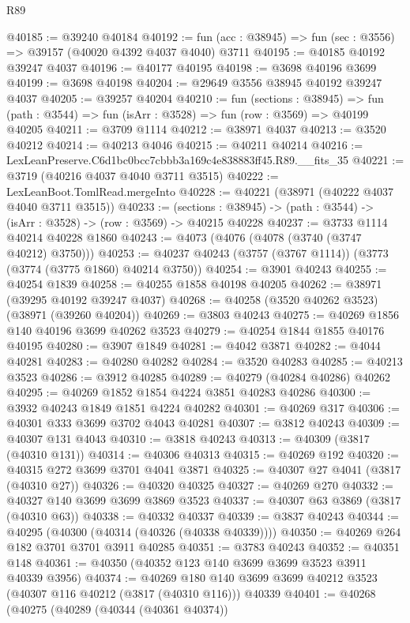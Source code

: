 \begin{lexlean}{R89}
\begin{coremodule}
@40185 := @39240 @40184
@40192 := fun (acc : @38945) => fun (sec : @3556) => @39157 (@40020 @4392 @4037 @4040) @3711
@40195 := @40185 @40192 @39247 @4037
@40196 := @40177 @40195
@40198 := @3698 @40196 @3699
@40199 := @3698 @40198
@40204 := @29649 @3556 @38945 @40192 @39247 @4037
@40205 := @39257 @40204
@40210 := fun (sections : @38945) =>
  fun (path : @3544) => fun (isArr : @3528) => fun (row : @3569) => @40199 @40205
@40211 := @3709 @1114
@40212 := @38971 @4037
@40213 := @3520 @40212
@40214 := @40213 @4046
@40215 := @40211 @40214
@40216 := LexLeanPreserve.C6d1bc0bcc7cbbb3a169c4e838883ff45.R89.__fits_35
@40221 := @3719 (@40216 @4037 @4040 @3711 @3515)
@40222 := LexLeanBoot.TomlRead.mergeInto
@40228 := @40221 (@38971 (@40222 @4037 @4040 @3711 @3515))
@40233 := (sections : @38945) -> (path : @3544) -> (isArr : @3528) -> (row : @3569) -> @40215 @40228
@40237 := @3733 @1114 @40214 @40228 @1860
@40243 := @4073 (@4076 (@4078 (@3740 (@3747 @40212) @3750)))
@40253 := @40237 @40243 (@3757 (@3767 @1114)) (@3773 (@3774 (@3775 @1860) @40214 @3750))
@40254 := @3901 @40243
@40255 := @40254 @1839
@40258 := @40255 @1858 @40198 @40205
@40262 := @38971 (@39295 @40192 @39247 @4037)
@40268 := @40258 (@3520 @40262 @3523) (@38971 (@39260 @40204))
@40269 := @3803 @40243
@40275 := @40269 @1856 @140 @40196 @3699 @40262 @3523
@40279 := @40254 @1844 @1855 @40176 @40195
@40280 := @3907 @1849
@40281 := @4042 @3871
@40282 := @4044 @40281
@40283 := @40280 @40282
@40284 := @3520 @40283
@40285 := @40213 @3523
@40286 := @3912 @40285
@40289 := @40279 (@40284 @40286) @40262
@40295 := @40269 @1852 @1854 @4224 @3851 @40283 @40286
@40300 := @3932 @40243 @1849 @1851 @4224 @40282
@40301 := @40269 @317
@40306 := @40301 @333 @3699 @3702 @4043 @40281
@40307 := @3812 @40243
@40309 := @40307 @131 @4043
@40310 := @3818 @40243
@40313 := @40309 (@3817 (@40310 @131))
@40314 := @40306 @40313
@40315 := @40269 @192
@40320 := @40315 @272 @3699 @3701 @4041 @3871
@40325 := @40307 @27 @4041 (@3817 (@40310 @27))
@40326 := @40320 @40325
@40327 := @40269 @270
@40332 := @40327 @140 @3699 @3699 @3869 @3523
@40337 := @40307 @63 @3869 (@3817 (@40310 @63))
@40338 := @40332 @40337
@40339 := @3837 @40243
@40344 := @40295 (@40300 (@40314 (@40326 (@40338 @40339))))
@40350 := @40269 @264 @182 @3701 @3701 @3911 @40285
@40351 := @3783 @40243
@40352 := @40351 @148
@40361 := @40350 (@40352 @123 @140 @3699 @3699 @3523 @3911 @40339 @3956)
@40374 := @40269
    @180
    @140
    @3699
    @3699
    @40212
    @3523
    (@40307 @116 @40212 (@3817 (@40310 @116)))
    @40339
@40401 := @40268
    (@40275
      (@40289
        (@40344 (@40361 @40374))

\end{coremodule}
\end{lexlean}
